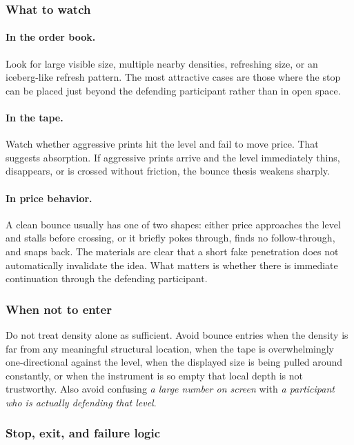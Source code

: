 \subsubsection{What to watch}

\paragraph{In the order book.}
Look for large visible size, multiple nearby densities, refreshing size, or an iceberg-like
refresh pattern. The most attractive cases are those where the stop can be placed just beyond
the defending participant rather than in open space.

\paragraph{In the tape.}
Watch whether aggressive prints hit the level and fail to move price. That suggests absorption.
If aggressive prints arrive and the level immediately thins, disappears, or is crossed without
friction, the bounce thesis weakens sharply.

\paragraph{In price behavior.}
A clean bounce usually has one of two shapes: either price approaches the level and stalls
before crossing, or it briefly pokes through, finds no follow-through, and snaps back. The
materials are clear that a short fake penetration does not automatically invalidate the idea.
What matters is whether there is immediate continuation through the defending participant.

\subsubsection{When not to enter}

Do not treat density alone as sufficient. Avoid bounce entries when the density is far from any
meaningful structural location, when the tape is overwhelmingly one-directional against the
level, when the displayed size is being pulled around constantly, or when the instrument is so
empty that local depth is not trustworthy. Also avoid confusing \emph{a large number on screen}
with \emph{a participant who is actually defending that level}.

\subsubsection{Stop, exit, and failure logic}

